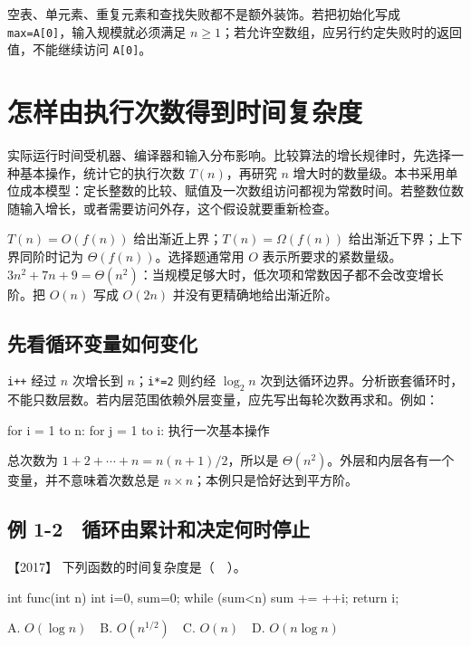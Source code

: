 空表、单元素、重复元素和查找失败都不是额外装饰。若把初始化写成 \texttt{max=\allowbreak{}A[0]}，输入规模就必须满足 \(n\ge1\)；若允许空数组，应另行约定失败时的返回值，不能继续访问 \texttt{A[0]}。

\section{怎样由执行次数得到时间复杂度}\label{DS01-03}

实际运行时间受机器、编译器和输入分布影响。比较算法的增长规律时，先选择一种基本操作，统计它的执行次数 \(T(n)\)，再研究 \(n\) 增大时的数量级。本书采用单位成本模型：定长整数的比较、赋值及一次数组访问都视为常数时间。若整数位数随输入增长，或者需要访问外存，这个假设就要重新检查。

\(T(n)=O(f(n))\) 给出渐近上界；\(T(n)=\Omega(f(n))\) 给出渐近下界；上下界同阶时记为 \(\Theta(f(n))\)。选择题通常用 \(O\) 表示所要求的紧数量级。\(3n^2+7n+9=\Theta(n^2)\)：当规模足够大时，低次项和常数因子都不会改变增长阶。把 \(O(n)\) 写成 \(O(2n)\) 并没有更精确地给出渐近阶。

\subsection{先看循环变量如何变化}\label{DS01-detail1}

\texttt{i+\allowbreak{}+\allowbreak{}} 经过 \(n\) 次增长到 \(n\)；\texttt{i*\allowbreak{}=\allowbreak{}2} 则约经 \(\log_2n\) 次到达循环边界。分析嵌套循环时，不能只数层数。若内层范围依赖外层变量，应先写出每轮次数再求和。例如：

\begin{codeblock}[language={}]
for i = 1 to n:
    for j = 1 to i:
        执行一次基本操作
\end{codeblock}

总次数为 \(1+2+\cdots+n=n(n+1)/2\)，所以是 \(\Theta(n^2)\)。外层和内层各有一个变量，并不意味着次数总是 \(n\times n\)；本例只是恰好达到平方阶。

\subsection{例 1-2　循环由累计和决定何时停止}\label{DS01-ex2}

\begin{example}[配套例题]

【2017】 下列函数的时间复杂度是（　）。

\begin{codeblock}[language=C]
int func(int n) {
    int i=0, sum=0;
    while (sum<n) sum += ++i;
    return i;
}
\end{codeblock}

A. \(O(\log n)\)　B. \(O(n^{1/2})\)　C. \(O(n)\)　D. \(O(n\log n)\)

\end{example}

